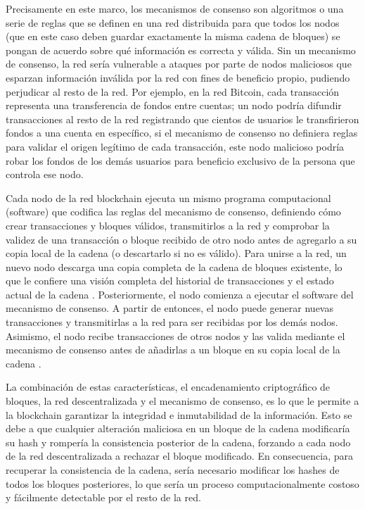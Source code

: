 Precisamente en este marco, los mecanismos de consenso son algoritmos o una serie de reglas que se definen en una red distribuida para que todos los nodos (que en este caso deben guardar exactamente la misma cadena de bloques) se pongan de acuerdo sobre qué información es correcta y válida. Sin un mecanismo de consenso, la red sería vulnerable a ataques por parte de nodos maliciosos que esparzan información inválida por la red con fines de beneficio propio, pudiendo perjudicar al resto de la red. Por ejemplo, en la red Bitcoin, cada transacción representa una transferencia de fondos entre cuentas; un nodo podría difundir transacciones al resto de la red registrando que cientos de usuarios le transfirieron fondos a una cuenta en específico, si el mecanismo de consenso no definiera reglas para validar el origen legítimo de cada transacción, este nodo malicioso podría robar los fondos de los demás usuarios para beneficio exclusivo de la persona que controla ese nodo.

Cada nodo de la red blockchain ejecuta un mismo programa computacional (software) que codifica las reglas del mecanismo de consenso, definiendo cómo crear transacciones y bloques válidos, transmitirlos a la red y comprobar la validez de una transacción o bloque recibido de otro nodo antes de agregarlo a su copia local de la cadena (o descartarlo si no es válido). Para unirse a la red, un nuevo nodo descarga una copia completa de la cadena de bloques existente, lo que le confiere una visión completa del historial de transacciones y el estado actual de la cadena \cite{bulkowska2023implementation}. Posteriormente, el nodo comienza a ejecutar el software del mecanismo de consenso. A partir de entonces, el nodo puede generar nuevas transacciones y transmitirlas a la red para ser recibidas por los demás nodos. Asimismo, el nodo recibe transacciones de otros nodos y las valida mediante el mecanismo de consenso antes de añadirlas a un bloque en su copia local de la cadena \cite{bulkowska2023implementation}.

La combinación de estas características, el encadenamiento criptográfico de bloques, la red descentralizada y el mecanismo de consenso, es lo que le permite a la blockchain garantizar la integridad e inmutabilidad de la información. Esto se debe a que cualquier alteración maliciosa en un bloque de la cadena modificaría su hash y rompería la consistencia posterior de la cadena, forzando a cada nodo de la red descentralizada a rechazar el bloque modificado. En consecuencia, para recuperar la consistencia de la cadena, sería necesario modificar los hashes de todos los bloques posteriores, lo que sería un proceso computacionalmente costoso y fácilmente detectable por el resto de la red.

